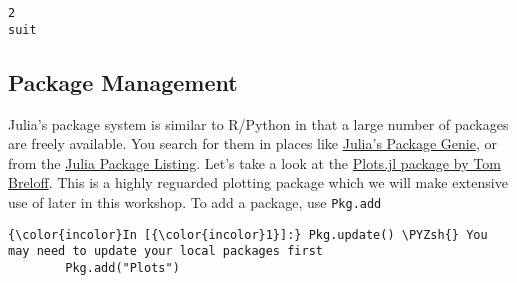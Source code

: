 \documentclass[11pt]{article}
\def\PYZsh{\char`\#}
\begin{document}
    \begin{Verbatim}[commandchars=\\\{\}]
2
suit

    \end{Verbatim}

    \subsection{Package Management}\label{package-management}

Julia's package system is similar to R/Python in that a large number of
packages are freely available. You search for them in places like
\href{http://genieframework.com/packages}{Julia's Package Genie}, or
from the \href{http://pkg.julialang.org/}{Julia Package Listing}. Let's
take a look at the \href{https://github.com/tbreloff/Plots.jl}{Plots.jl
package by Tom Breloff}. This is a highly reguarded plotting package
which we will make extensive use of later in this workshop. To add a
package, use \texttt{Pkg.add}

    \begin{Verbatim}[commandchars=\\\{\}]
{\color{incolor}In [{\color{incolor}1}]:} Pkg.update() \PYZsh{} You may need to update your local packages first
        Pkg.add("Plots")
\end{Verbatim}
\end{document}
